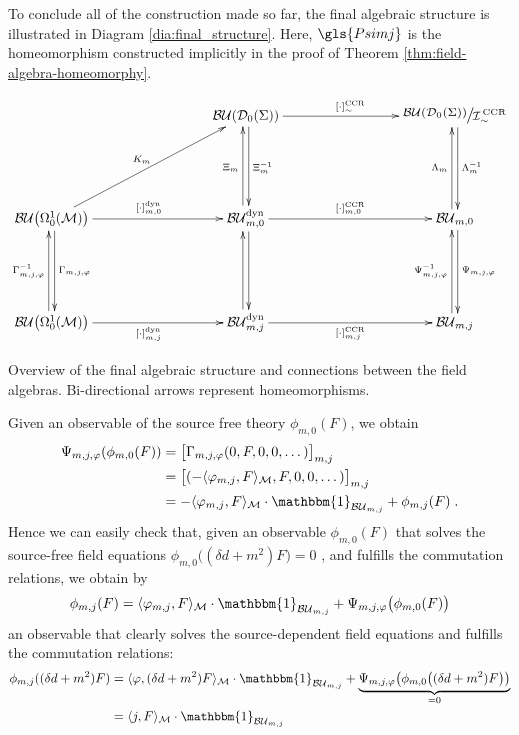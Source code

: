 To conclude all of the construction made so far, the final algebraic structure is illustrated in Diagram \ref{dia:final_structure}. Here, $\gls{Psimj}$ is the homeomorphism constructed implicitly in the proof of Theorem \ref{thm:field-algebra-homeomorphy}.
\begin{table}[]
\begin{displaymath}
\xymatrix @R=20mm @C=30mm
{ 																																	& \BU{\left( \Dzs \right)} 		\ar[r]^{[\cdot]_{\sim}^\text{CCR}}		\ar@<.5ex>[d]^{\Xi^{-1}_{m}}				& {{\Quotientscale{\BU{\left( \Dzs \right)}}{\ICCR}}} \ar@<.5ex>[d]^{\Lambda^{-1}_m}\\
	\BUOmega \ar[r]^{[\cdot]_{m,0}^\text{dyn}}  	\ar@<.5ex>[d]^{\Gamma_{m,j,\varphi}} \ar[ur]^{K_m}	&  \BUmzdyn  \ar[r]^{[\cdot]_{m,0}^\text{CCR}} \ar@<.5ex>[u]^{\Xi_{m}}  \ar@<.5ex>[d] &   \BUmz \ar@<.5ex>[d]^{\Psi_{m,j,\varphi}} \ar@<.5ex>[u]^{\Lambda_m}  \\
	\BUOmega  \ar[r]_{[\cdot]_{m,j}^\text{dyn}}      \ar@<.5ex>[u]^{\Gamma^{-1}_{m,j,\varphi}}    & \BUmjdyn \ar[r]_{[\cdot]_{m,j}^\text{CCR}}	\ar@<.5ex>[u]& 	\BUmj 	\ar@<.5ex>[u]^{\Psi_{m,j,\varphi}^{-1}}     \\
}
\end{displaymath}
\caption{Overview of the final algebraic structure and connections between the field algebras. Bi-directional arrows represent homeomorphisms.}
\label{dia:final_structure}
\end{table}
%
Given an observable of the source free theory $\phi_{m,0}(F)$, we obtain
\begin{align}
\Psi_{m,j,\varphi}(\phi_{m,0}(F))
&= \big[ \Gamma_{m,j,\varphi}(0,F,0,0,\dots)\big]_{m,j} \notag\\
&= \big[ (-\langle \varphi_{m,j}, F \rangle_\M,F,0,0,\dots)\big]_{m,j} \notag\\
&=  -\langle \varphi_{m,j}, F \rangle_\M \cdot \mathbbm{1}_\BUmj + \phi_{m,j}(F) \formspace.
\end{align}
Hence we can easily check that, given an observable $\phi_{m,0}(F)$ that solves the source-free field equations $\phi_{m,0}\big((\delta d + m^2)F\big)=0$ , and fulfills the commutation relations, we obtain by
\begin{align}
\phi_{m,j}(F) = \langle \varphi_{m,j}, F \rangle_\M \cdot \mathbbm{1}_\BUmj + \Psi_{m,j,\varphi}\big(\phi_{m,0}(F)\big)
\end{align}
an observable that clearly solves the source-dependent field equations and fulfills the commutation relations:
\begin{align}
\phi_{m,j}((\delta d+m^2)F)
&=  \langle \varphi, (\delta d +m^2)F \rangle_\M \cdot \mathbbm{1}_\BUmj + \underbrace{\Psi_{m,j,\varphi}\big(\phi_{m,0}\big((\delta d+m^2)F\big)\big)}_{=0 }\notag\\
&= \langle j, F \rangle_\M \cdot \mathbbm{1}_\BUmj
\end{align}
